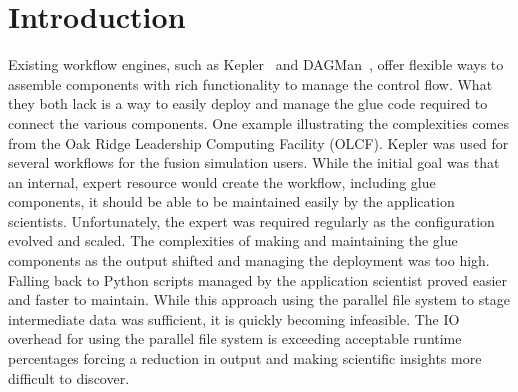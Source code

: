 \documentclass[conference]{IEEEtran}
\begin{document}

\section{Introduction}
\label{s:intro}


Existing workflow engines, such as Kepler~\cite{bertram:2006:kepler} and
DAGMan~\cite{Malewicz:2006:dagman}, offer flexible ways to assemble components
with rich functionality to manage the control flow. What they both lack is a
way to easily deploy and manage the glue code required to connect the various
components. One example illustrating the complexities comes from the Oak Ridge
Leadership Computing Facility (OLCF).  Kepler was used for several workflows
for the fusion simulation users.  While the initial goal was that an internal,
expert resource would create the workflow, including glue components, it should
be able to be maintained easily by the application scientists. Unfortunately,
the expert was required regularly as the configuration evolved and scaled. The
complexities of making and maintaining the glue components as the output
shifted and managing the deployment was too high.  Falling back to Python
scripts managed by the application scientist proved easier and faster to
maintain. While this approach using the parallel file system to stage
intermediate data was sufficient, it is quickly becoming infeasible. The IO
overhead for using the parallel file system is exceeding acceptable runtime
percentages forcing a reduction in output and making scientific insights more
difficult to discover.
\end{document}
